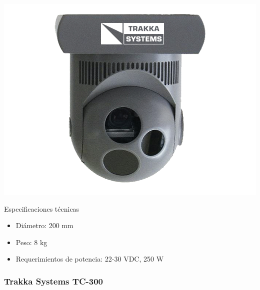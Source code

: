 \noindent\begin{minipage}{0.3\textwidth}%
	\includegraphics[width=\linewidth]{imagenes/200-LE}
\end{minipage}%
\hfill%
\begin{minipage}{0.7\textwidth}
Especificaciones técnicas
	\begin{itemize}
		\item Diámetro: 200 mm
		\item Peso: 8 kg
		\item Requerimientos de potencia: 22-30 VDC, 250 W
	\end{itemize}
\end{minipage}

\subsubsection*{Trakka Systems TC-300}

